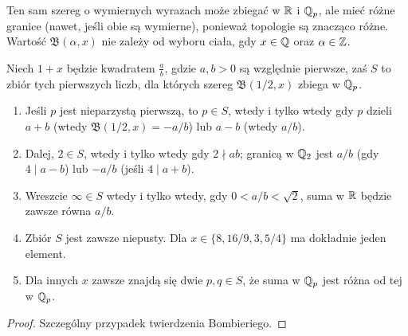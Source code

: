 Ten sam szereg o wymiernych wyrazach może zbiegać w $\mathbb{R}$ i $\mathbb{Q}_p$, ale mieć różne granice (nawet, jeśli obie są wymierne), ponieważ topologie są znacząco różne.
Wartość $\mathfrak B(\alpha, x)$ nie zależy od wyboru ciała, gdy $x \in \mathbb{Q}$ oraz $\alpha \in \mathbb{Z}$.


\begin{fakt}
	Niech $1+x$ będzie kwadratem $\frac ab$, gdzie $a, b > 0$ są względnie pierwsze, zaś $S$ to zbiór tych pierwszych liczb, dla których szereg $\mathfrak B(1/2,x)$ zbiega w $\mathbb{Q}_p$.
	\begin{enumerate}
		\item Jeśli $p$ jest nieparzystą pierwszą, to $p \in S$, wtedy i tylko wtedy gdy $p$ dzieli $a+b$ (wtedy $\mathfrak B(1/2,x) = -a/b$) lub $a-b$ (wtedy $a/b$).
		\item Dalej, $2 \in S$, wtedy i tylko wtedy gdy $2 \nmid ab$; granicą w $\mathbb{Q}_2$ jest $a/b$ (gdy $4 \mid a - b$) lub $-a/b$ (jeśli $4 \mid a + b$).
		\item Wreszcie $\infty \in S$ wtedy i tylko wtedy, gdy $0 < a/b < \sqrt{2}$, suma w $\mathbb{R}$ będzie zawsze równa $a/b$.
		\item Zbiór $S$ jest zawsze niepusty.
		Dla $x \in \{8, 16/9, 3, 5/4\}$ ma dokładnie jeden element.
		\item Dla innych $x$ zawsze znajdą się dwie $p, q \in S$, że suma w $\mathbb{Q}_p$ jest różna od tej w $\mathbb{Q}_p$.
	\end{enumerate}
\end{fakt}

\begin{proof}
	Szczególny przypadek twierdzenia Bombieriego.
\end{proof}